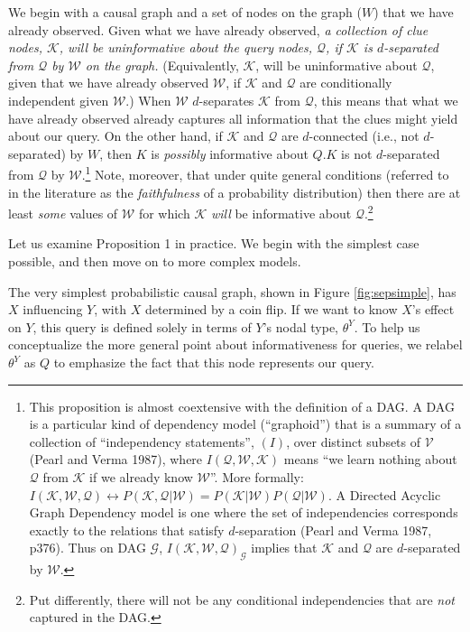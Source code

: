 \documentclass[
  12pt,
]{book}
\begin{document}
We begin with a causal graph and a set of nodes on the graph (\(W\)) that we have already observed. Given what we have already observed, \emph{a collection of clue nodes, \(\mathcal K\), will be uninformative about the query nodes, \(\mathcal Q\), if \(\mathcal K\) is \(d\)-separated from \(\mathcal Q\) by \(\mathcal W\) on the graph.} (Equivalently, \(\mathcal K\), will be uninformative about \(\mathcal Q\), given that we have already observed \(\mathcal W\), if \(\mathcal K\) and \(\mathcal Q\) are conditionally independent given \(\mathcal W\).) When \(\mathcal W\) \(d\)-separates \(\mathcal K\) from \(\mathcal Q\), this means that what we have already observed already captures all information that the clues might yield about our query. On the other hand, if \(\mathcal K\) and \(\mathcal Q\) are \(d\)-connected (i.e., not \(d\)-separated) by \(W\), then \(K\) is \emph{possibly} informative about \(Q\).\(K\) is not \(d\)-separated from \(\mathcal Q\) by \(\mathcal W\).\footnote{This proposition is almost coextensive with the definition of a DAG. A DAG is a particular kind of dependency model (``graphoid'') that is a summary of a collection of ``independency statements'', \((I)\), over distinct subsets of \(\mathcal V\) (Pearl and Verma 1987), where \(I(\mathcal Q,\mathcal W,\mathcal K)\) means ``we learn nothing about \(\mathcal Q\) from \(\mathcal K\) if we already know \(\mathcal W\)''. More formally:
  \(I(\mathcal K, \mathcal W,\mathcal Q) \leftrightarrow P(\mathcal K,\mathcal Q|\mathcal W)=P(\mathcal K|\mathcal W)P(\mathcal Q|\mathcal W)\). A Directed Acyclic Graph Dependency model is one where the set of independencies corresponds exactly to the relations that satisfy \(d\)-separation (Pearl and Verma 1987, p376). Thus on DAG \(\mathcal G\), \(I(\mathcal K,\mathcal W,\mathcal Q)_{\mathcal G}\) implies that \(\mathcal K\) and \(\mathcal Q\) are \(d\)-separated by \(\mathcal W\).} Note, moreover, that under quite general conditions (referred to in the literature as the \emph{faithfulness} of a probability distribution) then there are at least \emph{some} values of \(\mathcal W\) for which \(\mathcal K\) \emph{will} be informative about \(\mathcal Q\).\footnote{Put differently, there will not be any conditional independencies that are \emph{not} captured in the DAG.}

Let us examine Proposition 1 in practice. We begin with the simplest case possible, and then move on to more complex models.

The very simplest probabilistic causal graph, shown in Figure \ref{fig:sepsimple}, has \(X\) influencing \(Y\), with \(X\) determined by a coin flip. If we want to know \(X\)'s effect on \(Y\), this query is defined solely in terms of \(Y\)'s nodal type, \(\theta^Y\). To help us conceptualize the more general point about informativeness for queries, we relabel \(\theta^Y\) as \(Q\) to emphasize the fact that this node represents our query.
\end{document}
